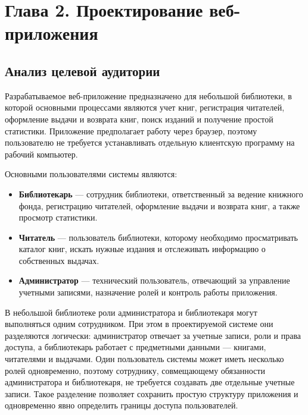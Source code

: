 \section*{Глава 2. Проектирование веб-приложения}

\subsection{Анализ целевой аудитории}

Разрабатываемое веб-приложение предназначено для небольшой библиотеки, в которой
основными процессами являются учет книг, регистрация читателей, оформление выдачи
и возврата книг, поиск изданий и получение простой статистики. Приложение
предполагает работу через браузер, поэтому пользователю не требуется устанавливать
отдельную клиентскую программу на рабочий компьютер.

Основными пользователями системы являются:

\begin{itemize}
    \item \textbf{Библиотекарь} --- сотрудник библиотеки, ответственный за ведение
          книжного фонда, регистрацию читателей, оформление выдачи и возврата
          книг, а также просмотр статистики.

    \item \textbf{Читатель} --- пользователь библиотеки, которому необходимо
          просматривать каталог книг, искать нужные издания и отслеживать
          информацию о собственных выдачах.

    \item \textbf{Администратор} --- технический пользователь, отвечающий за
          управление учетными записями, назначение ролей и контроль работы
          приложения.
\end{itemize}

В небольшой библиотеке роли администратора и библиотекаря могут выполняться одним
сотрудником. При этом в проектируемой системе они разделяются логически:
администратор отвечает за учетные записи, роли и права доступа, а библиотекарь
работает с предметными данными --- книгами, читателями и выдачами. Один
пользователь системы может иметь несколько ролей одновременно, поэтому сотруднику,
совмещающему обязанности администратора и библиотекаря, не требуется создавать
две отдельные учетные записи. Такое разделение позволяет сохранить простую
структуру приложения и одновременно явно определить границы доступа пользователей.

